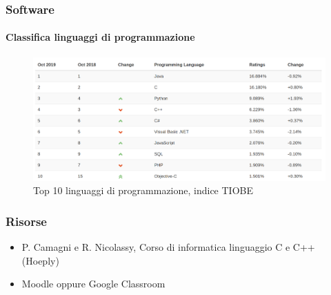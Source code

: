 \documentclass[11pt]{beamer}
\begin{document}
    \begin{frame}
        \frametitle{Software}
        \framesubtitle{Classifica linguaggi di programmazione}

        \begin{figure}
            \includegraphics[scale=0.2]{img/classifica-lp-tiobe.png}
            \caption{Top 10 linguaggi di programmazione, indice TIOBE}
        \end{figure}
    \end{frame}

    \begin{frame}
        \frametitle{Risorse}

        \begin{itemize}
            \item P. Camagni e R. Nicolassy, Corso di informatica linguaggio C e C++ (Hoeply)
            \item Moodle oppure Google Classroom
        \end{itemize}
    \end{frame}
\end{document}
